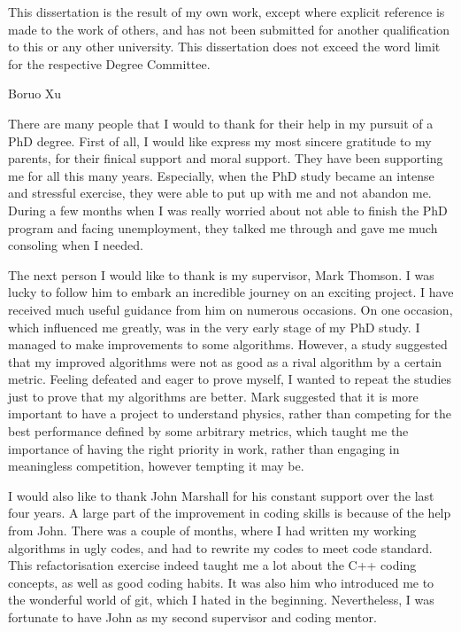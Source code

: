 \begin{declaration}
  This dissertation is the result of my own work, except where explicit
  reference is made to the work of others, and has not been submitted
  for another qualification to this or any other university. This
  dissertation does not exceed the word limit for the respective Degree
  Committee.
  \vspace*{1cm}
  \begin{flushright}
    Boruo Xu
  \end{flushright}
\end{declaration}


\begin{acknowledgements}
There are many people that I would to thank  for their help in my pursuit of a PhD degree. First of all, I would like express my most sincere gratitude to my parents, for their finical support and moral support. They have been supporting me for all this many years. Especially, when the PhD study became an intense and stressful exercise, they were able to put up with me and not abandon me. During a few months when I was really worried about not able to finish the PhD program and facing unemployment, they talked me through and gave me much consoling  when I needed.

The next person I would like to thank is my supervisor, Mark Thomson. I was lucky to follow him to embark an incredible journey on an exciting project. I have received much useful guidance from him on numerous occasions. On one occasion, which influenced me greatly, was in the very early stage of my PhD study. I managed to make improvements to some algorithms. However, a study suggested that my improved algorithms were not as good as a rival algorithm by a certain metric. Feeling defeated and eager to prove myself, I wanted to repeat the studies just to prove that my algorithms are better. Mark suggested that it is more important to have a project to understand physics, rather than competing for the best performance defined by some arbitrary metrics, which taught me the importance of having the right priority in work, rather than engaging in meaningless competition, however tempting it may be.

I would also like to thank John Marshall for his constant support over the last four years. A large part of the improvement in coding skills is because of the help from John. There was a couple of months, where I had written my working algorithms in ugly codes, and had to rewrite my codes to meet \pandora code standard. This refactorisation exercise indeed taught me a lot about the C++ coding concepts, as well as good coding habits. It was also him who introduced me to the wonderful world of git, which I hated in the beginning. Nevertheless, I was fortunate to have John as my second supervisor and coding mentor.


\end{acknowledgements}
